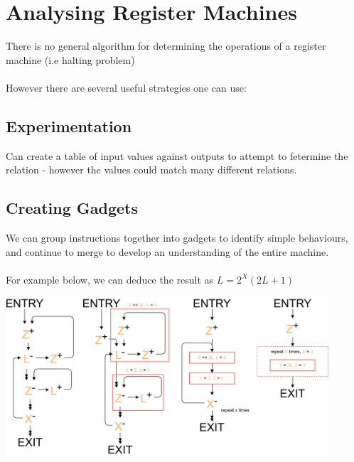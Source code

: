 \section{Analysing Register Machines}
There is no general algorithm for determining the operations of a register machine (i.e halting problem)
\\
\\ However there are several useful strategies one can use:

\subsection{Experimentation}
Can create a table of input values against outputs to attempt to fetermine the relation - however the values could match many different relations.

\subsection{Creating Gadgets}
We can group instructions together into gadgets to identify simple behaviours, and continue to merge to develop an understanding of the entire machine.
\\
\\ For example below, we can deduce the result as $L = 2^X(2L + 1)$
\begin{center}
    \includegraphics[width=0.9\textwidth]{register_machines/images/rm_analysis.drawio.png}
\end{center}

